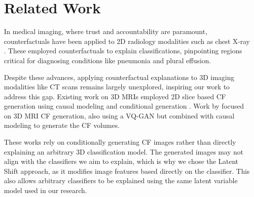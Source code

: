 \section{Related Work}
In medical imaging, where trust and accountability are paramount, counterfactuals have been applied to 2D radiology modalities such as chest X-ray \cite{Singla2021BlackBoxSmoothly, Seah2019GVR_CFs}. These employed counterfactuals to explain classifications, pinpointing regions critical for diagnosing conditions like pneumonia and plural effusion.

Despite these advances, applying counterfactual explanations to 3D imaging modalities like CT scans remains largely unexplored, inspiring our work to address this gap.
Existing work on 3D MRIs employed 2D slice based CF generation using causal modeling \cite{Ribeiro2023SCM_CF} and conditional generation \cite{Kumar2022MRICF}. 
Work by \citet{Peng2024BrainMRI3D} focused on 3D MRI CF generation, also using a VQ-GAN but combined with causal modeling to generate the CF volumes. 

These works rely on conditionally generating CF images rather than directly explaining an arbitrary 3D classification model. The generated images may not align with the classifiers we aim to explain, which is why we chose the Latent Shift approach, as it modifies image features based directly on the classifier. This also allows arbitrary classifiers to be explained using the same latent variable model used in our research.